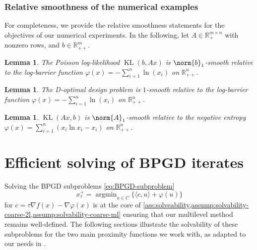 \documentclass[11pt,reqno]{amsart}
\numberwithin{equation}{section}
\numberwithin{figure}{section}
\theoremstyle{plain}
\newtheorem{lemma}[theorem]{Lemma}
\theoremstyle{definition}
\newcommand{\R}{\mathbb{R}}
\newcommand{\la}{\langle}
\newcommand{\ra}{\rangle}
\newcommand{\vphi}{\varphi}
\newcommand{\dvphi}{\nabla \vphi}
\newcommand{\df}{\nabla f}
\DeclareMathOperator*{\argmin}{arg min}
\DeclareMathOperator{\KL}{KL}
\begin{document}
\subsubsection{Relative smoothness of the numerical examples} \label{sec:rel-smth-for-num-exps}
For completeness, we provide the relative smoothness statements for the objectives of our numerical experiments. In the following, let $A \in \R^{m \times n}_{+}$ with nonzero rows, and $b \in \R^m_{++}$.
\begin{lemma}{\cite[Lemma 7]{Bauschke:2017aa}} \label{lm:klbAx_rel_smth_to_log_barrier}
    The Poisson log-likelihood $\KL(b,Ax)$ is $\norm{b}_1$-smooth relative to the log-barrier function $\vphi(x) = - \sum_{i = 1}^n \ln(x_i)$ on $\R^n_{++}$.
\end{lemma}


\begin{lemma}{\cite[Proposition 2.2]{Lu2018}} \label{lm:d-opt-design_rel_smth_to_log_barrier}
    The D-optimal design problem is $1$-smooth relative to the log-barrier function $\vphi(x) = - \sum_{i = 1}^n \ln(x_i)$ on $\R^n_{++}$. 
\end{lemma}

\begin{lemma}{\cite[Lemma 8]{Bauschke:2017aa}}\label{lm:klAxb_rel_smth_to_neg_entropy}
    $\KL(Ax,b)$ is $\norm{A}_1$-smooth relative to the negative entropy $\vphi(x) = \sum_{i = 1}^n \left(x_i\ln x_i - x_i\right)$ on $\R^n_{++}$.
\end{lemma}

\section{Efficient solving of BPGD iterates}
Solving the BPGD subproblems \eqref{eq:BPGD-subproblem}
\begin{equation*}
    x^{+}_\tau = \argmin_{u \in C} \{\la c, u \ra + \vphi(u) \}
\end{equation*}
for $c = \tau \df(x) - \dvphi(x)$ is at the core of \cref{ass:solveability,assump:solvability-coarse-2l,assump:solvability-coarse-ml} ensuring that our multilevel method remains well-defined. The following sections illustrate the solvability of these subproblems for the two main proximity functions we work with, as adapted to our needs in .
\end{document}
